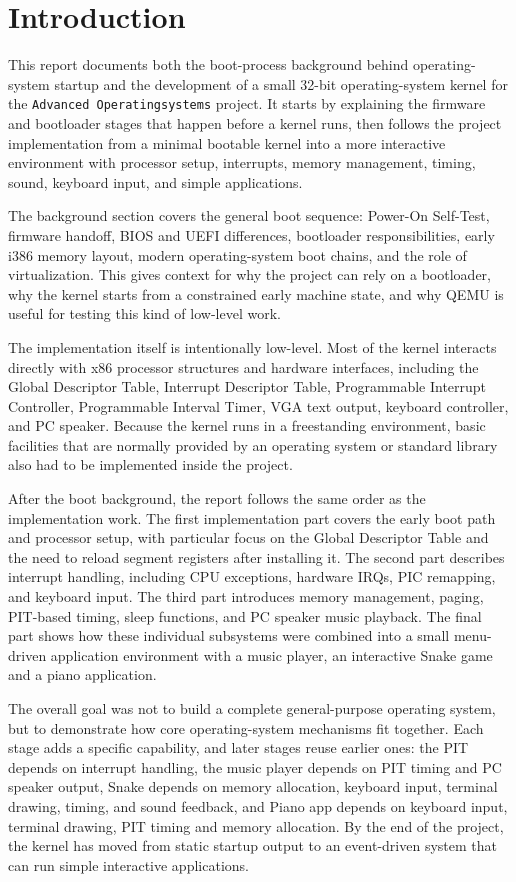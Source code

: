 \section{Introduction}

This report documents both the boot-process background behind operating-system startup and the development of a small 32-bit operating-system kernel for the \texttt{Advanced Operatingsystems} project. It starts by explaining the firmware and bootloader stages that happen before a kernel runs, then follows the project implementation from a minimal bootable kernel into a more interactive environment with processor setup, interrupts, memory management, timing, sound, keyboard input, and simple applications.

The background section covers the general boot sequence: Power-On Self-Test, firmware handoff, BIOS and UEFI differences, bootloader responsibilities, early i386 memory layout, modern operating-system boot chains, and the role of virtualization. This gives context for why the project can rely on a bootloader, why the kernel starts from a constrained early machine state, and why QEMU is useful for testing this kind of low-level work.

The implementation itself is intentionally low-level. Most of the kernel interacts directly with x86 processor structures and hardware interfaces, including the Global Descriptor Table, Interrupt Descriptor Table, Programmable Interrupt Controller, Programmable Interval Timer, VGA text output, keyboard controller, and PC speaker. Because the kernel runs in a freestanding environment, basic facilities that are normally provided by an operating system or standard library also had to be implemented inside the project.

After the boot background, the report follows the same order as the implementation work. The first implementation part covers the early boot path and processor setup, with particular focus on the Global Descriptor Table and the need to reload segment registers after installing it. The second part describes interrupt handling, including CPU exceptions, hardware IRQs, PIC remapping, and keyboard input. The third part introduces memory management, paging, PIT-based timing, sleep functions, and PC speaker music playback. The final part shows how these individual subsystems were combined into a small menu-driven application environment with a music player, an interactive Snake game and a piano application.

The overall goal was not to build a complete general-purpose operating system, but to demonstrate how core operating-system mechanisms fit together. Each stage adds a specific capability, and later stages reuse earlier ones: the PIT depends on interrupt handling, the music player depends on PIT timing and PC speaker output, Snake depends on memory allocation, keyboard input, terminal drawing, timing, and sound feedback, and Piano app depends on keyboard input, terminal drawing, PIT timing and memory allocation. By the end of the project, the kernel has moved from static startup output to an event-driven system that can run simple interactive applications.
